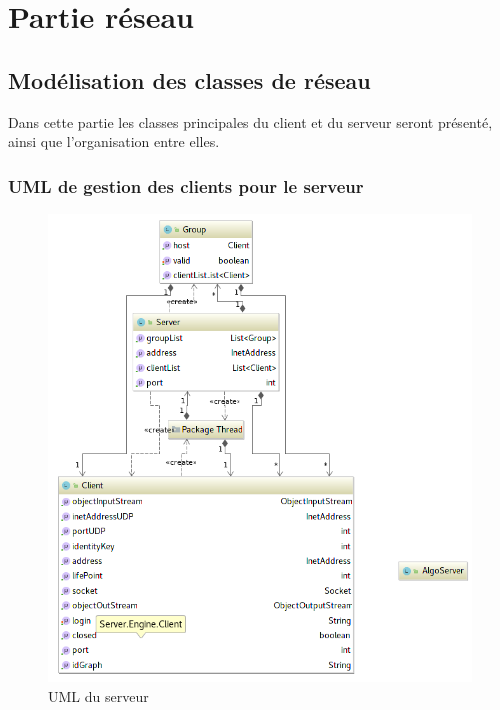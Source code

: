 \documentclass[a4paper,11pt]{report}
\title{}
\author{}
\begin{document}
\maketitle
\tableofcontents

\begin{abstract}
\end{abstract}

\chapter{Partie réseau}

\section{Modélisation des classes de réseau}
Dans cette partie les classes principales du client et du serveur seront présenté, ainsi que l'organisation entre elles.
\subsection{UML de gestion des clients pour le serveur}

    \begin{figure}[th]
      \begin{center}
        \includegraphics[scale=0.3]{Assets/UML_serveur.png}
        \caption{UML du serveur}
        \label{UML du serveur}
      \end{center}
    \end{figure}
    
\end{document}
